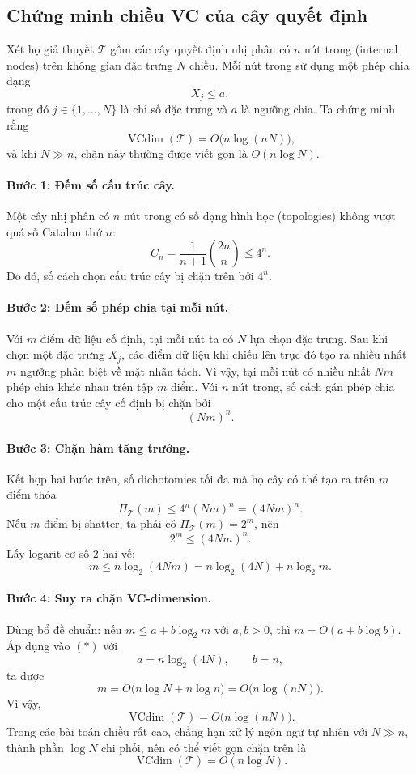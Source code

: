\begin{expandbox}
\subsection*{Chứng minh chiều VC của cây quyết định}

 Xét họ giả thuyết $\mathcal{T}$ gồm các cây quyết định nhị phân có $n$ nút trong (internal nodes) trên không gian đặc trưng $N$ chiều. Mỗi nút trong sử dụng một phép chia dạng
\[
  X_j\leq a,
\]
trong đó $j\in\{1,\ldots,N\}$ là chỉ số đặc trưng và $a$ là ngưỡng chia. Ta chứng minh rằng
\[
  \operatorname{VCdim}(\mathcal{T})=O\bigl(n\log(nN)\bigr),
\]
và khi $N\gg n$, chặn này thường được viết gọn là $O(n\log N)$.

\paragraph{Bước 1: Đếm số cấu trúc cây.}
Một cây nhị phân có $n$ nút trong có số dạng hình học (topologies) không vượt quá số Catalan thứ $n$:
\[
  C_n=\frac{1}{n+1}\binom{2n}{n}\leq 4^n.
\]
Do đó, số cách chọn cấu trúc cây bị chặn trên bởi $4^n$.

\paragraph{Bước 2: Đếm số phép chia tại mỗi nút.}
Với $m$ điểm dữ liệu cố định, tại mỗi nút ta có $N$ lựa chọn đặc trưng. Sau khi chọn một đặc trưng $X_j$, các điểm dữ liệu khi chiếu lên trục đó tạo ra nhiều nhất $m$ ngưỡng phân biệt về mặt nhãn tách. Vì vậy, tại mỗi nút có nhiều nhất $Nm$ phép chia khác nhau trên tập $m$ điểm. Với $n$ nút trong, số cách gán phép chia cho một cấu trúc cây cố định bị chặn bởi
\[
  (Nm)^n.
\]

\paragraph{Bước 3: Chặn hàm tăng trưởng.}
Kết hợp hai bước trên, số dichotomies tối đa mà họ cây có thể tạo ra trên $m$ điểm thỏa
\[
  \Pi_{\mathcal{T}}(m)\leq 4^n(Nm)^n=(4Nm)^n.
\]
Nếu $m$ điểm bị shatter, ta phải có $\Pi_{\mathcal{T}}(m)=2^m$, nên
\[
  2^m\leq (4Nm)^n.
\]
Lấy logarit cơ số 2 hai vế:
\[
  m\leq n\log_2(4Nm)
   = n\log_2(4N)+n\log_2 m. \tag{*}
\]

\paragraph{Bước 4: Suy ra chặn VC-dimension.}
Dùng bổ đề chuẩn: nếu $m\leq a+b\log_2 m$ với $a,b>0$, thì $m=O(a+b\log b)$. Áp dụng vào $(*)$ với
\[
  a=n\log_2(4N),\qquad b=n,
\]
ta được
\[
  m=O\bigl(n\log N+n\log n\bigr)=O\bigl(n\log(nN)\bigr).
\]
Vì vậy,
\[
  \operatorname{VCdim}(\mathcal{T})=O\bigl(n\log(nN)\bigr).
\]
Trong các bài toán chiều rất cao, chẳng hạn xử lý ngôn ngữ tự nhiên với $N\gg n$, thành phần $\log N$ chi phối, nên có thể viết gọn chặn trên là
\[
  \operatorname{VCdim}(\mathcal{T})=O(n\log N).
\]
\end{expandbox}